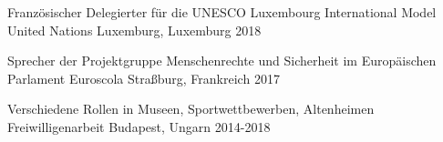 

\begin{cventries}

  \cventry
    {Französischer Delegierter für die UNESCO} %
    {Luxembourg International Model United Nations} %
    {Luxemburg, Luxemburg} %
    {2018} %
    {}
  
  
  \cventry
    {Sprecher der Projektgruppe Menschenrechte und Sicherheit im Europäischen Parlament} %
    {Euroscola} %
    {Straßburg, Frankreich} %
    {2017} %
    {}
     
  
 \cventry
    {Verschiedene Rollen in Museen, Sportwettbewerben, Altenheimen} %
    {Freiwilligenarbeit} %
    {Budapest, Ungarn} %
    {2014-2018} %
    {}
    


\end{cventries}
